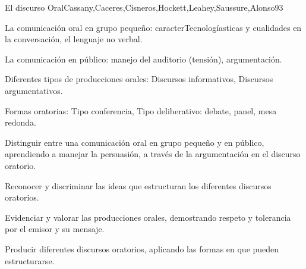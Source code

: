 \begin{syllabus}
\begin{unit}{El discurso Oral}{Cassany,Caceres,Cisneros,Hockett,Leahey,Saussure,Alonso}{9}{3}
\begin{topics}
   \item La comunicación oral en grupo pequeño: caracterTecnologíasticas y cualidades en la conversación, el lenguaje no  verbal.
   \item La comunicación en público: manejo del auditorio (tensión), argumentación.
   \item Diferentes tipos de producciones orales: Discursos informativos, Discursos argumentativos.
   \item Formas oratorias: Tipo conferencia, Tipo deliberativo: debate, panel, mesa redonda.
\end{topics}
\begin{unitgoals}
   \item Distinguir entre una comunicación oral en grupo pequeño y en público, aprendiendo a manejar la persuasión, a través de la argumentación en el discurso oratorio.
   \item Reconocer y discriminar las ideas que estructuran los diferentes discursos oratorios.
   \item Evidenciar y valorar las producciones orales, demostrando respeto y tolerancia por el emisor y su mensaje.
   \item Producir diferentes discursos oratorios, aplicando las formas en que pueden estructurarse.
\end{unitgoals}
\end{unit}



\begin{coursebibliography}
\end{coursebibliography}

\end{syllabus}
